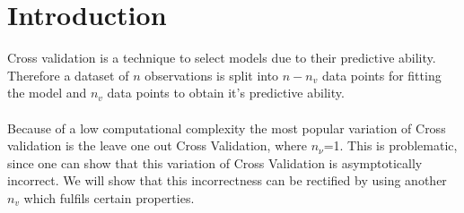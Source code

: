 \documentclass[Research_Module_ES.tex]{subfiles}
\begin{document}
\section{Introduction}	


















Cross validation is a technique to select models due to their predictive ability. Therefore a dataset of $n$ observations is split into $n-n_v$ data points for fitting the model and $n_v$ data points to obtain it's predictive ability.  \\
\\
Because of a low computational complexity the most popular variation of Cross validation is the leave one out Cross Validation, where $n_\nu$=1.
This is problematic, since one can show that this variation of Cross Validation is asymptotically incorrect. We will  show that this incorrectness can be rectified by using another $n_v$ which fulfils certain properties. 
\end{document}
